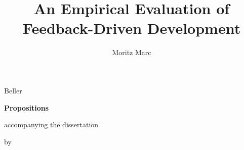 \documentclass{dissertation}
\begin{document}
\title{An Empirical Evaluation of Feedback-Driven Development}
\author{Moritz Marc}{Beller}

\begin{center}

{\Large\titlefont\bfseries Propositions}

\bigskip

accompanying the dissertation

\bigskip

{\makeatletter
\titlestyle\bfseries\large\@title
\makeatother}

{\makeatletter
\ifx\@subtitle\undefined\else
    \titlefont\titleshape\@subtitle
\fi
\makeatother}

\bigskip

by

\bigskip

\makeatletter
{\large\titlefont\bfseries\@firstname\ {\titleshape\@lastname}}
\makeatother

\end{center}

\bigskip
\bigskip
\end{document}
